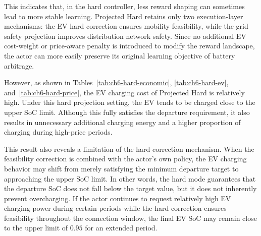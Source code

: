This indicates that, in the hard controller, less reward shaping can sometimes lead to more stable learning. Projected Hard retains only two execution-layer mechanisms: the EV hard correction ensures mobility feasibility, while the grid safety projection improves distribution network safety. Since no additional EV cost-weight or price-aware penalty is introduced to modify the reward landscape, the actor can more easily preserve its original learning objective of battery arbitrage.

However, as shown in Tables~\ref{tab:ch6-hard-economic}, \ref{tab:ch6-hard-ev}, and~\ref{tab:ch6-hard-price}, the EV charging cost of Projected Hard is relatively high. Under this hard projection setting, the EV tends to be charged close to the upper SoC limit. Although this fully satisfies the departure requirement, it also results in unnecessary additional charging energy and a higher proportion of charging during high-price periods.

This result also reveals a limitation of the hard correction mechanism. When the feasibility correction is combined with the actor's own policy, the EV charging behavior may shift from merely satisfying the minimum departure target to approaching the upper SoC limit. In other words, the hard mode guarantees that the departure SoC does not fall below the target value, but it does not inherently prevent overcharging. If the actor continues to request relatively high EV charging power during certain periods while the hard correction ensures feasibility throughout the connection window, the final EV SoC may remain close to the upper limit of \(0.95\) for an extended period.

\begin{table}[htbp]
  \centering
  \caption{EV Departure SoC and Feasibility Indices for EV Hard Controllers}
  \label{tab:ch6-hard-ev}
\end{table}


